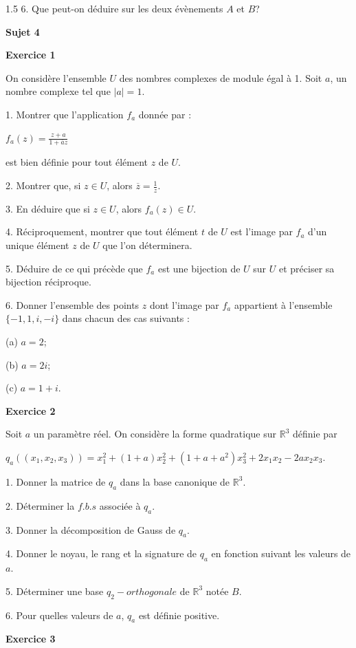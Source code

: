 \documentclass[12pt]{article}
\begin{document}
\begin{spacing}{1.5}
 6. Que peut-on déduire sur les deux évènements $A$ et $B$?
 
 
 \quad
 \quad
 
 \textbf{Sujet 4}
 
 \textbf{Exercice 1}
 
  On considère l'ensemble $U$ des nombres complexes de module égal à 1. Soit $a$, un nombre
 complexe tel que $\mid a\mid= 1$.
 
 1. Montrer que l'application $f_a$ donnée par :
 
 $f_a(z) = \frac{z+a}{1+\overline{a}z} $
 
 est bien définie pour tout élément $z$ de $U$.
 
 2. Montrer que, si $z\in U$, alors $\overline{z} = \frac{1}{z}$.
 
 3. En déduire que si $z\in U$, alors $f_a(z)\in U$.
 
 4. Réciproquement, montrer que tout élément $t$ de $U$ est l'image par $f_a$ d'un unique élément
 $z$ de $U$ que l'on déterminera.
 
 5. Déduire de ce qui précède que $f_a$ est une bijection de $U$ sur $U$ et préciser sa bijection
 réciproque.
 
 6. Donner l'ensemble des points $z$ dont l'image par $f_a$ appartient à l'ensemble $\lbrace {-1,1,i,-i} \rbrace$ dans chacun des cas suivants :
 
 (a) $a = 2$;
 
 (b) $a = 2i$;
 
 (c) $a = 1+i$.
 
 \textbf{Exercice 2 }
 
  Soit $a$ un paramètre réel. On considère la forme quadratique sur $\mathbb{R}^3$ définie par
 
 $q_a((x_1,x_2,x_3)) = x^{2}_1 + (1 + a)x^{2}_2 + (1 + a+a^2)x^{2}_3 +2x_1x_2-2ax_2x_3$.
 
 1. Donner la matrice de $q_a$ dans la base canonique de $\mathbb{R}^3$.
 
 2. Déterminer la $f.b.s$ associée à $q_a$.
 
 3. Donner la décomposition de Gauss de $q_a$.
 
 4. Donner le noyau, le rang et la signature de $q_a$ en fonction suivant les valeurs de $a$.
 
 5. Déterminer une base $q_2-orthogonale$ de $\mathbb{R}^3$ notée $B$.
 
 6. Pour quelles valeurs de $a$, $q_a$ est définie positive.
 
 \medskip\textbf{Exercice 3}
 

\end{spacing}
\end{document}
